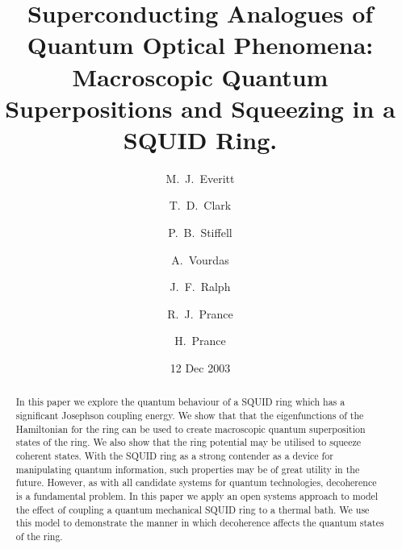 \documentclass[12pt,a4paper,superscriptaddress,showpacs,floatfix,pra]{revtex4-2}
\begin{document}
\title{Superconducting Analogues of Quantum Optical Phenomena: Macroscopic
Quantum Superpositions and Squeezing in a SQUID Ring.}
\author{M.~J.~Everitt}
\author{T.~D.~Clark}
\author{P.~B.~Stiffell}
\author{A.~Vourdas}
\author{J.~F.~Ralph}
\author{R.~J.~Prance}
\author{H.~Prance}
\date{12 Dec 2003 }

\begin{abstract}
In this paper  we explore the quantum behaviour of  a SQUID ring which
has a  significant Josephson  coupling energy. We  show that  that the
eigenfunctions of the  Hamiltonian for the ring can  be used to create
macroscopic  quantum superposition states  of the  ring. We  also show
that  the   ring  potential  may  be  utilised   to  squeeze  coherent
states. With  the SQUID  ring as  a strong contender  as a  device for
manipulating  quantum information,  such  properties may  be of  great
utility  in the  future. However,  as with  all candidate  systems for
quantum technologies,  decoherence is  a fundamental problem.  In this
paper  we  apply an  open  systems approach  to  model  the effect  of
coupling a  quantum mechanical  SQUID ring to  a thermal bath.  We use
this model to demonstrate the  manner in which decoherence affects the
quantum states of the ring.
\end{abstract}

\maketitle
\end{document}
